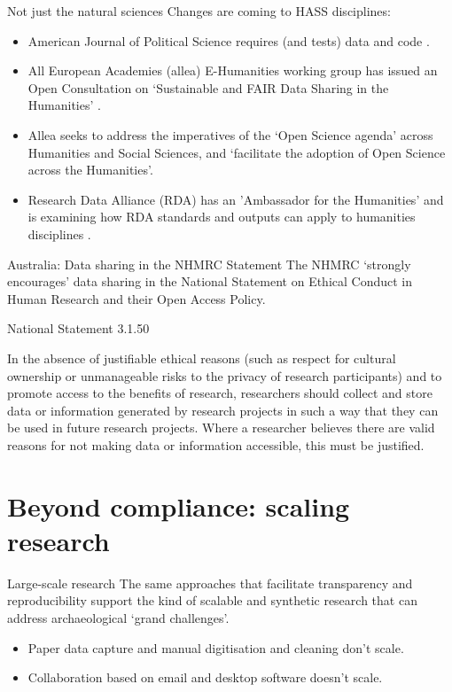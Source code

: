 \documentclass[aspectratio=169, 11pt]{beamer} %
\begin{document}
\begin{frame}{Not just the natural sciences}
  Changes are coming to HASS disciplines:
    \begin{itemize}[label=\textbullet]
        \item American Journal of Political Science requires (and tests) data and code \cite{Jacoby2017-lw, Ajps2015-ex}.
        \item All European Academies (allea) E-Humanities working group \cite{Allea2019-wy} has issued an Open Consultation on `Sustainable and FAIR Data Sharing in the Humanities' \cite{Allea2019-aw}.
        \item Allea seeks to address the imperatives of the `Open Science agenda' across Humanities and Social Sciences, and `facilitate the adoption of Open Science across the Humanities'.
        \item Research Data Alliance (RDA) has an 'Ambassador for the Humanities' and is examining how RDA standards and outputs can apply to humanities disciplines \cite{Rda2019-wc}.
    \end{itemize}
\end{frame}

\begin{frame}{Australia: Data sharing in the NHMRC Statement}
    The NHMRC `strongly encourages' data sharing in the National Statement on Ethical Conduct in Human Research and their Open Access Policy. \cite{Nhmrc2018-sj, Nhmrc2018-vn} \par
    National Statement 3.1.50 \par
    In the absence of justifiable ethical reasons (such as respect for cultural ownership or unmanageable risks to the privacy of research participants) and to promote access to the benefits of research, researchers should collect and store data or information generated by research projects in such a way that they can be used in future research projects. Where a researcher believes there are valid reasons for not making data or information accessible, this must be justified.
\end{frame}

\section{Beyond compliance: scaling research}

\begin{frame}{Large-scale research}
    The same approaches that facilitate transparency and reproducibility support the kind of scalable and synthetic research that can address archaeological `grand challenges'. \cite{Kintigh2014-ub}
        \begin{itemize}[label=\textbullet]
            \item Paper data capture and manual digitisation and cleaning don't scale.
            \item Collaboration based on email and desktop software doesn't scale.
    \end{itemize}
    
\end{frame}
\end{document}
